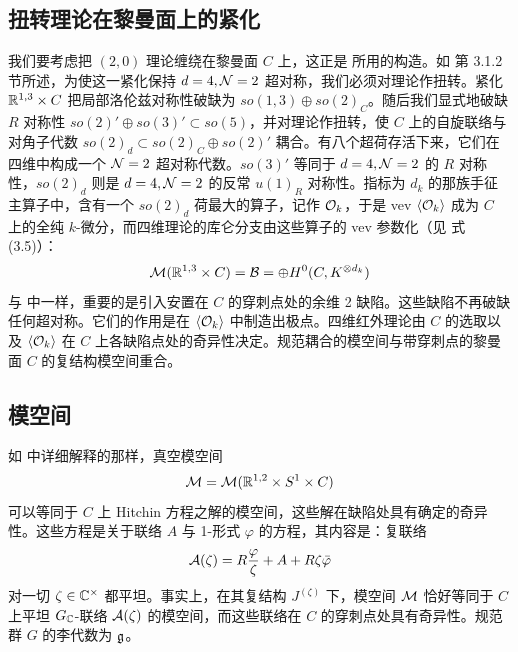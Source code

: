 
\subsection{扭转理论在黎曼面上的紧化}\label{subsec:Twisted-C}

我们要考虑把 $(2,0)$ 理论缠绕在黎曼面 $C$ 上，这正是 \cite{Gaiotto:2009hg} 所用的构造。如 \cite{Gaiotto:2009hg} 第 3.1.2 节所述，为使这一紧化保持 $d=4,\mathcal{N}=2$ 超对称，我们必须对理论作扭转。紧化 $\mathbb{R}^{1,3}\times C$ 把局部洛伦兹对称性破缺为 $so(1,3)\oplus so(2)_C$。随后我们显式地破缺 $R$ 对称性 $so(2)'\oplus so(3)'\subset so(5)$，并对理论作扭转，使 $C$ 上的自旋联络与对角子代数 $so(2)_d\subset so(2)_C\oplus so(2)'$ 耦合。有八个超荷存活下来，它们在四维中构成一个 $\mathcal{N}=2$ 超对称代数。$so(3)'$ 等同于 $d=4,\mathcal{N}=2$ 的 $R$ 对称性，$so(2)_d$ 则是 $d=4,\mathcal{N}=2$ 的反常 $u(1)_R$ 对称性。指标为 $d_k$ 的那族手征主算子中，含有一个 $so(2)_d$ 荷最大的算子，记作 $\mathcal{O}_k$，于是 vev $\langle\mathcal{O}_k\rangle$ 成为 $C$ 上的全纯 $k$-微分，而四维理论的库仑分支由这些算子的 vev 参数化（见 \cite{Gaiotto:2009hg} 式 (3.5)）：
\begin{equation}
\mathcal{M}(\mathbb{R}^{1,3}\times C) = \mathcal{B} = \oplus H^0(C, K^{\otimes d_k})
\end{equation}
与 \cite{Gaiotto:2009hg} 中一样，重要的是引入安置在 $C$ 的穿刺点处的余维 2 缺陷。这些缺陷不再破缺任何超对称。它们的作用是在 $\langle\mathcal{O}_k\rangle$ 中制造出极点。四维红外理论由 $C$ 的选取以及 $\langle\mathcal{O}_k\rangle$ 在 $C$ 上各缺陷点处的奇异性决定。规范耦合的模空间与带穿刺点的黎曼面 $C$ 的复结构模空间重合。

\subsection{模空间}

如 \cite{Gaiotto:2009hg} 中详细解释的那样，真空模空间
\begin{equation}
\mathcal{M} = \mathcal{M}(\mathbb{R}^{1,2}\times S^1\times C)
\end{equation}
可以等同于 $C$ 上 Hitchin 方程之解的模空间，这些解在缺陷处具有确定的奇异性。这些方程是关于联络 $A$ 与 1-形式 $\varphi$ 的方程，其内容是：复联络
\begin{equation} \label{eq:flat-conn}
\mathcal{A}(\zeta) = R\frac{\varphi}{\zeta} + A + R\zeta\bar\varphi
\end{equation}
对一切 $\zeta\in\mathbb{C}^\times$ 都平坦。事实上，在其复结构 $J^{(\zeta)}$ 下，模空间 $\mathcal{M}$ 恰好等同于 $C$ 上平坦 $G_{\mathbb{C}}$-联络 $\mathcal{A}(\zeta)$ 的模空间，而这些联络在 $C$ 的穿刺点处具有奇异性。规范群 $G$ 的李代数为 $\mathfrak{g}$。

